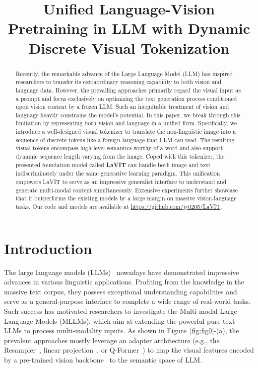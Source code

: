\title{Unified Language-Vision Pretraining in LLM with Dynamic Discrete Visual Tokenization}



\maketitle

\begin{abstract}
Recently, the remarkable advance of the Large Language Model (LLM) has inspired researchers to transfer its extraordinary reasoning capability to both vision and language data. However, the prevailing approaches primarily regard the visual input as a prompt and focus exclusively on optimizing the text generation process conditioned upon vision content by a frozen LLM. Such an inequitable treatment of vision and language heavily constrains the model's potential. In this paper, we break through this limitation by representing both vision and language in a unified form. Specifically, we introduce a well-designed visual tokenizer to translate the non-linguistic image into a sequence of discrete tokens like a foreign language that LLM can read. The resulting visual tokens encompass high-level semantics worthy of a word and also support dynamic sequence length varying from the image. Coped with this tokenizer, the presented foundation model called \textbf{LaVIT} can handle both image and text indiscriminately under the same generative learning paradigm. This unification empowers LaVIT to serve as an impressive generalist interface to understand and generate multi-modal content simultaneously. Extensive experiments further showcase that it outperforms the existing models by a large margin on massive vision-language tasks. Our code and models are available at \url{https://github.com/jy0205/LaVIT}.
\end{abstract}

\section{Introduction}
The large language models (LLMs)~\citep{brown2020language,touvron2023llama} nowadays have demonstrated impressive advances in various linguistic applications. Profiting from the knowledge in the massive text corpus, they possess exceptional understanding capabilities and serve as a general-purpose interface to complete a wide range of real-world tasks. Such success has motivated researchers to investigate the Multi-modal Large Language Models (MLLMs), which aim at extending the powerful pure-text LLMs to process multi-modality inputs. As shown in Figure~\ref{fig:fig0}-(a), the prevalent approaches mostly leverage an adapter architecture (e.g., the Resampler~\citep{alayrac2022flamingo}, linear projection~\citep{liu2023visual}, or Q-Former~\citep{li2023blip}) to map the visual features encoded by a pre-trained vision backbone~\citep{radford2021learning} to the semantic space of LLM. 


